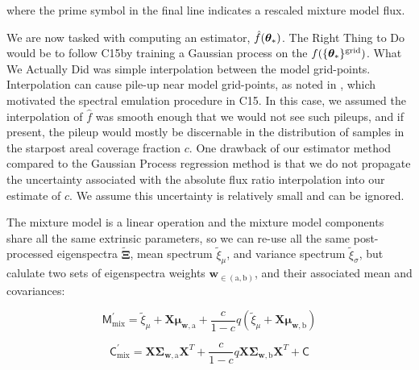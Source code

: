 \documentclass[onecolumn]{emulateapj}%
\newcommand{\iancze}{{\sc C15}}
\begin{document}
where the prime symbol in the final line indicates a rescaled mixture model flux.  

We are now tasked with computing an estimator, $\hat f({\bm \theta}_{\ast})$.  The Right Thing to Do would be to follow \iancze by training a Gaussian process on the $f(\{{\bm \theta}_{\ast}\}^\textrm{grid})$.  What We Actually Did was simple interpolation between the model grid-points.  Interpolation can cause pile-up near model grid-points, as noted in \citet{2014ApJ...794..125C}, which motivated the spectral emulation procedure in \iancze.  In this case, we assumed the interpolation of $\hat f$ was smooth enough that we would not see such pileups, and if present, the pileup would mostly be discernable in the distribution of samples in the starpost areal coverage fraction $c$.  One drawback of our estimator method compared to the Gaussian Process regression method is that we do not propagate the uncertainty associated with the absolute flux ratio interpolation into our estimate of $c$.  We assume this uncertainty is relatively small and can be ignored.

The mixture model is a linear operation and the mixture model components share all the same extrinsic parameters, so we can re-use all the same post-processed eigenspectra $\widetilde{\mathbf{\Xi}}$, mean spectrum $\widetilde{\xi}_\mu$, and variance spectrum $\widetilde{\xi}_\sigma$, but calulate two sets of eigenspectra weights $\mathbf{w}_{\in (\mathrm{a}, \mathrm{b})}$, and their associated mean and covariances:

\begin{equation}
  \mathsf{M}_{\mathrm{mix}}^\prime = \widetilde{\xi}_\mu + \mathbf{X} \mathbf{\mu}_{\mathbf{w}, \mathrm{a}} + \frac{c}{1-c} q (\widetilde{\xi}_\mu + \mathbf{X} \mathbf{\mu}_{\mathbf{w}, \mathrm{b}})
\end{equation}

\begin{equation}
  \mathsf{C}_{\mathrm{mix}}^\prime = \mathbf{X} \mathbf{\Sigma}_\mathbf{w, \mathrm{a}} \mathbf{X}^T + \frac{c}{1-c} q \mathbf{X} \mathbf{\Sigma}_\mathbf{w, \mathrm{b}} \mathbf{X}^T + \mathsf{C}
  \label{eqn:modC}
\end{equation}
\end{document}
